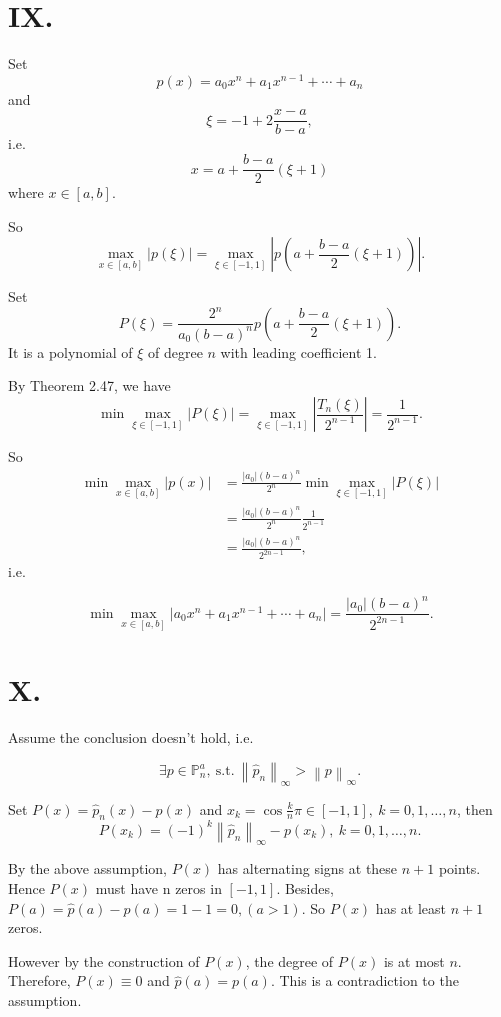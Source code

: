 \documentclass[a4paper]{article}
\begin{document}
\section*{IX.}

Set
$$p(x) = a_{0}x^n + a_{1} x^{n-1} + \cdots + a_n$$ 
and 
$$\xi = -1 + 2\frac{x - a}{b - a},$$ 
i.e.
$$x = a+\frac{b-a}{2}(\xi+1)$$
where $x\in [a, b]$.

So
$$
  \max_{x \in [a,b]} \lvert p(\xi)\rvert = \max_{\xi\in[-1,1]} \left|p\left(a+\frac{b-a}{2}(\xi+1)\right)\right|.
$$

Set
$$
P(\xi) = \frac{2^n}{a_0 ({b-a})^n} p\left(a+\frac{b-a}{2}(\xi+1)\right).
$$
It is a polynomial of $\xi$ of degree $n$ with leading coefficient 1.

By Theorem 2.47, we have
$$
\min \max_{\xi\in[-1,1]} \lvert P(\xi)\rvert = \max_{\xi\in[-1,1]} \left|\frac{T_n(\xi)}{2^{n-1}}\right| = \frac{1}{2^{n-1}}.
$$

So
$$
\begin{aligned}
   \min \max_{x \in [a,b]} |p(x)| &=  \frac{\lvert a_0\rvert ({b-a})^n}{2^n} \min\max_{\xi\in[-1,1]} \lvert P(\xi)\rvert\\
   &= \frac{\lvert a_0\rvert ({b-a})^n}{2^n} \frac{1}{2^{n-1}}  \\
   &= \frac{\lvert a_0\rvert ({b-a})^n}{2^{2n-1}},
\end{aligned}
$$
i.e.

$$
\min\max_{x\in[a,b]}\lvert a_0x^n + a_1 x^{n-1} + \cdots + a_n\rvert = \frac{\lvert a_0\rvert ({b-a})^n}{2^{2n-1}}.
$$

\section*{X.}
Assume the conclusion doesn't hold, i.e.

$$
\exists p \in \mathbb{P}^a_{n},\ \mathrm{s.t.} \ \left \| \hat{p}_{n} \right \|_{\infty} > \left \| p \right \|_{\infty}.
$$

Set $P(x) = \hat{p}_n(x) - p(x)$ and $x_k = \cos \frac{k}{n}\pi\in[-1,1],\ k= 0, 1, \dots, n$, then
$$
P(x_k) = (-1)^{k}\left \|\hat{p}_n \right \|_{\infty} - p(x_k),\ k= 0, 1, \dots, n.
$$

By the above assumption, $P(x)$ has alternating signs at these $n+1$ points. Hence $P(x)$ must have n zeros in $[-1, 1]$.
Besides, $P(a) = \hat{p}(a) - p(a) = 1 - 1 = 0, (a > 1)$. So $P(x)$ has at least $n+1$ zeros. 

However by the construction of $P(x)$, the degree of $P(x)$ is at most $n$. Therefore, $P(x)\equiv0$ and $\hat{p}(a) = p(a)$.
This is a contradiction to the assumption.
\end{document}
